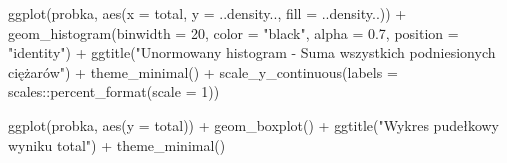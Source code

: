 \documentclass[
  letterpaper,
  DIV=11,
  numbers=noendperiod]{scrartcl}
\newenvironment{Shaded}{\begin{snugshade}}{\end{snugshade}}
\newcommand{\AttributeTok}[1]{\textcolor[rgb]{0.40,0.45,0.13}{#1}}
\newcommand{\DecValTok}[1]{\textcolor[rgb]{0.68,0.00,0.00}{#1}}
\newcommand{\FloatTok}[1]{\textcolor[rgb]{0.68,0.00,0.00}{#1}}
\newcommand{\FunctionTok}[1]{\textcolor[rgb]{0.28,0.35,0.67}{#1}}
\newcommand{\NormalTok}[1]{\textcolor[rgb]{0.00,0.23,0.31}{#1}}
\newcommand{\SpecialCharTok}[1]{\textcolor[rgb]{0.37,0.37,0.37}{#1}}
\newcommand{\StringTok}[1]{\textcolor[rgb]{0.13,0.47,0.30}{#1}}
\begin{document}
\begin{Shaded}
\begin{Highlighting}[]
\FunctionTok{ggplot}\NormalTok{(probka, }\FunctionTok{aes}\NormalTok{(}\AttributeTok{x =}\NormalTok{ total, }\AttributeTok{y =}\NormalTok{ ..density.., }\AttributeTok{fill =}\NormalTok{ ..density..)) }\SpecialCharTok{+}
  \FunctionTok{geom\_histogram}\NormalTok{(}\AttributeTok{binwidth =} \DecValTok{20}\NormalTok{, }\AttributeTok{color =} \StringTok{"black"}\NormalTok{, }\AttributeTok{alpha =} \FloatTok{0.7}\NormalTok{, }\AttributeTok{position =} \StringTok{"identity"}\NormalTok{) }\SpecialCharTok{+}
  \FunctionTok{ggtitle}\NormalTok{(}\StringTok{"Unormowany histogram {-} Suma wszystkich podniesionych ciężarów"}\NormalTok{) }\SpecialCharTok{+}
  \FunctionTok{theme\_minimal}\NormalTok{() }\SpecialCharTok{+}
  \FunctionTok{scale\_y\_continuous}\NormalTok{(}\AttributeTok{labels =}\NormalTok{ scales}\SpecialCharTok{::}\FunctionTok{percent\_format}\NormalTok{(}\AttributeTok{scale =} \DecValTok{1}\NormalTok{))}

\FunctionTok{ggplot}\NormalTok{(probka, }\FunctionTok{aes}\NormalTok{(}\AttributeTok{y =}\NormalTok{ total)) }\SpecialCharTok{+}
  \FunctionTok{geom\_boxplot}\NormalTok{() }\SpecialCharTok{+}
  \FunctionTok{ggtitle}\NormalTok{(}\StringTok{"Wykres pudełkowy wyniku total"}\NormalTok{) }\SpecialCharTok{+}
  \FunctionTok{theme\_minimal}\NormalTok{()}
\end{Highlighting}
\end{Shaded}
\end{document}

